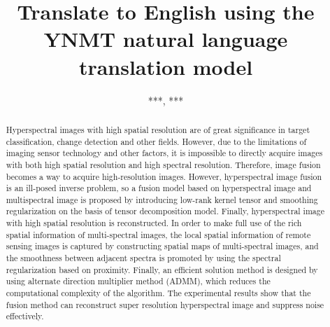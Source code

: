 \documentclass[journal]{IEEEtran}%
\title{Translate to English using the YNMT natural language translation model}%
\author{***, ***}%
\begin{document}
%
\normalsize%
\maketitle%
\begin{abstract}
Hyperspectral images with high spatial resolution are of great significance in target classification, change detection and other fields. However, due to the limitations of imaging sensor technology and other factors, it is impossible to directly acquire images with both high spatial resolution and high spectral resolution. Therefore, image fusion becomes a way to acquire high-resolution images. However, hyperspectral image fusion is an ill-posed inverse problem, so a fusion model based on hyperspectral image and multispectral image is proposed by introducing low-rank kernel tensor and smoothing regularization on the basis of tensor decomposition model. Finally, hyperspectral image with high spatial resolution is reconstructed. In order to make full use of the rich spatial information of multi-spectral images, the local spatial information of remote sensing images is captured by constructing spatial maps of multi-spectral images, and the smoothness between adjacent spectra is promoted by using the spectral regularization based on proximity. Finally, an efficient solution method is designed by using alternate direction multiplier method (ADMM), which reduces the computational complexity of the algorithm. The experimental results show that the fusion method can reconstruct super resolution hyperspectral image and suppress noise effectively.
\end{abstract}%
\end{document}

